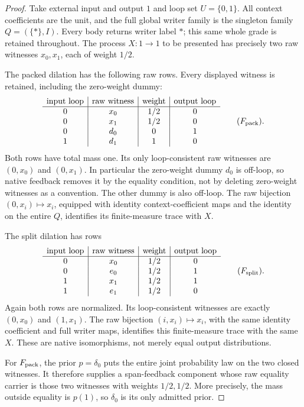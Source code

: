 \documentclass[11pt]{article}
\begin{document}
\begin{proof}
Take external input and output $1$ and loop set $U=\{0,1\}$. All context coefficients are the unit, and the full global writer family is the singleton family $Q=(\{*\},I)$. Every body returns writer label $*$; this same whole grade is retained throughout. The process $X:1\to1$ to be presented has precisely two raw witnesses $x_0,x_1$, each of weight $1/2$.

The packed dilation has the following raw rows. Every displayed witness is retained, including the zero-weight dummy:
\[
\begin{array}{c|c|c|c}
\text{input loop}&\text{raw witness}&\text{weight}&\text{output loop}\\\hline
0&x_0&1/2&0\\
0&x_1&1/2&0\\
0&d_0&0&1\\
1&d_1&1&0
\end{array}
\qquad (F_{\rm pack}).
\]
Both rows have total mass one. Its only loop-consistent raw witnesses are $(0,x_0)$ and $(0,x_1)$. In particular the zero-weight dummy $d_0$ is off-loop, so native feedback removes it by the equality condition, not by deleting zero-weight witnesses as a convention. The other dummy is also off-loop. The raw bijection $(0,x_i)\mapsto x_i$, equipped with identity context-coefficient maps and the identity on the entire $Q$, identifies its finite-measure trace with $X$.

The split dilation has rows
\[
\begin{array}{c|c|c|c}
\text{input loop}&\text{raw witness}&\text{weight}&\text{output loop}\\\hline
0&x_0&1/2&0\\
0&e_0&1/2&1\\
1&x_1&1/2&1\\
1&e_1&1/2&0
\end{array}
\qquad (F_{\rm split}).
\]
Again both rows are normalized. Its loop-consistent witnesses are exactly $(0,x_0)$ and $(1,x_1)$. The raw bijection $(i,x_i)\mapsto x_i$, with the same identity coefficient and full writer maps, identifies this finite-measure trace with the same $X$. These are native isomorphisms, not merely equal output distributions.

For $F_{\rm pack}$, the prior $p=\delta_0$ puts the entire joint probability law on the two closed witnesses. It therefore supplies a span-feedback component whose raw equality carrier is those two witnesses with weights $1/2,1/2$. More precisely, the mass outside equality is $p(1)$, so $\delta_0$ is its only admitted prior.


\end{proof}
\end{document}
